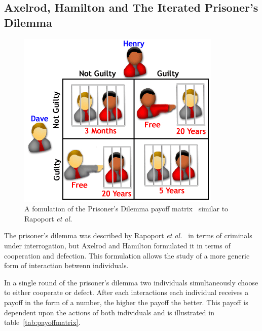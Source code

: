 \documentclass[]{final_report}
\begin{document}
\subsection{Axelrod, Hamilton and The Iterated Prisoner's Dilemma}
\label{sec:ipd}
\begin{figure}
\vspace{-20pt}
\begin{framed}
	\center
	\includegraphics[width=\textwidth]{LaymansIPD.png}
	\caption{A fomulation of the Prisoner's Dilemma payoff matrix~\cite{laymansipd} similar to Rapoport \textit{et al.}~\cite{rapoport1965prisoner}}
	\label{fig:ipdvis}
\end{framed}
\vspace{-20pt}
\end{figure}
The prisoner's dilemma was described by Rapoport \textit{et al.}~\cite{rapoport1965prisoner} in terms of criminals under interrogation, but Axelrod and Hamilton formulated it in terms of cooperation and defection. This formulation allows the study of a more generic form of interaction betwenn individuals.\par 
In a single round of the prisoner's dilemma two individuals simultaneously choose to either cooperate or defect. After each interactions each individual receives a payoff in the form of a number, the higher the payoff the better. This payoff is dependent upon the actions of both individuals and is illustrated in table~\ref{tab:payoffmatrix}.\par
\end{document}
